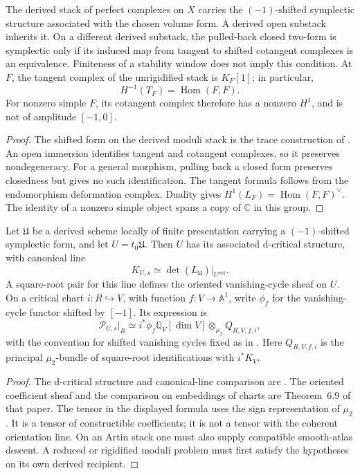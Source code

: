 \begin{proposition}
\label{prop:ptvv-finite-substack-symplectic}
The derived stack of perfect complexes on \(X\) carries the
\((-1)\)-shifted symplectic structure associated with the chosen volume
form.  A derived open substack inherits it.  On a different derived
substack, the pulled-back closed two-form is symplectic only if its
induced map from tangent to shifted cotangent complexes is an equivalence.
Finiteness of a stability window does not imply this condition.
At \(F\), the tangent complex of the unrigidified stack is \(K_F[1]\);
in particular,
\[
 H^{-1}(T_F)=\operatorname{Hom}(F,F).
\]
For nonzero simple \(F\), its cotangent complex therefore has a nonzero
\(H^1\), and is not of amplitude \([-1,0]\).
\end{proposition}
\begin{proof}
The shifted form on the derived moduli stack is the trace construction of
\cite{PTVV2013}.  An open immersion identifies tangent and cotangent
complexes, so it preserves nondegeneracy.  For a general morphism, pulling
back a closed form preserves closedness but gives no such identification.
The tangent formula follows from the endomorphism deformation complex.
Duality gives \(H^1(L_F)=\operatorname{Hom}(F,F)^\vee\).  The identity of a
nonzero simple object spans a copy of \(\mathbb C\) in this group.
\end{proof}

\begin{proposition}
\label{prop:joyce-dcritical-truncation}
Let \(\mathfrak U\) be a derived scheme locally of finite presentation
carrying a
\((-1)\)-shifted symplectic form, and let \(U=t_0\mathfrak U\).
Then \(U\) has its associated d-critical structure, with canonical line
\[
 K_{U,s}\simeq\det(L_{\mathfrak U})|_{U^{\mathrm{red}}}.
\]
A square-root pair for this line defines the oriented vanishing-cycle
sheaf on \(U\).  On a critical chart \(i:R\hookrightarrow V\), with
function \(f:V\to\mathbb A^1\), write \(\phi_f\) for the
vanishing-cycle functor shifted by \([-1]\).  Its expression is
\[
 \mathcal P_{U,s}|_R
 \simeq i^*\phi_f\mathbb Q_V[\dim V]\otimes_{\mu_2}Q_{R,V,f,i},
\]
with the convention for shifted vanishing cycles fixed as in
\cite[Theorem~6.9]{BBDJS2015}.  Here \(Q_{R,V,f,i}\) is the principal
\(\mu_2\)-bundle of square-root identifications with \(i^*K_V\).
\end{proposition}
\begin{proof}
The d-critical structure and canonical-line comparison are
\cite[Theorem~6.6]{BBDJS2015}.  The oriented coefficient sheaf and the
comparison on embeddings of charts are Theorem~6.9 of that paper.
The tensor in the displayed formula uses the sign representation of
\(\mu_2\).  It is a tensor of constructible coefficients; it is not a
tensor with the coherent orientation line.  On an Artin stack one must
also supply compatible smooth-atlas descent.  A reduced or rigidified
moduli problem must first satisfy the hypotheses on its own derived
recipient.
\end{proof}

